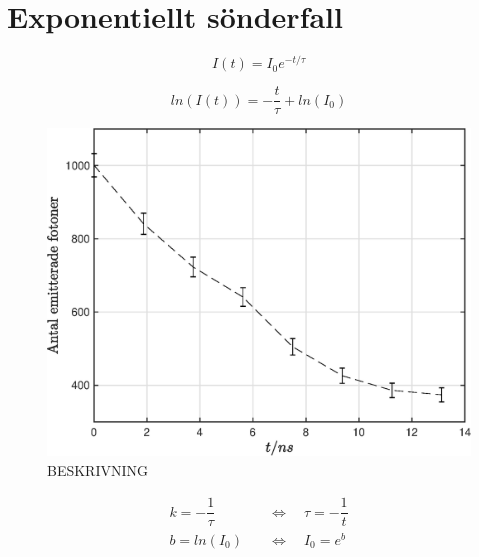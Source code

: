 
\section*{\centering Exponentiellt sönderfall}

\begin{equation} \label{eq:I_t}
	I(t) = I_0e^{-t/\tau}
\end{equation}

\begin{equation} \label{eq:log_I}
	ln(I(t)) = -\dfrac{t}{\tau} + ln(I_0)
\end{equation}

\begin{figure}[H]
    \centering
    \captionsetup{justification=centering,margin=2cm}
    \includegraphics[scale=0.4]{Resources/Graphics/fig1_1.eps}
    \caption{BESKRIVNING}
    \label{fig:1_1}
\end{figure}

\begin{align*}
    k = -\dfrac{1}{\tau} \quad &\Leftrightarrow \quad
	\tau = -\dfrac{1}{t} \\
	b = ln(I_0) \quad &\Leftrightarrow \quad
	I_0 = e^{b}
\end{align*}

